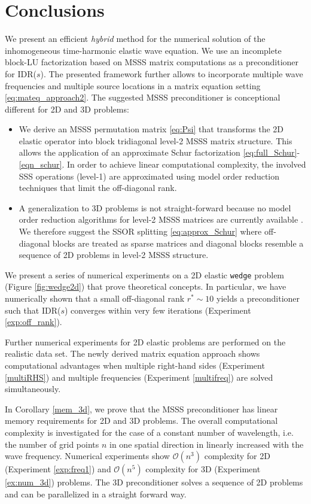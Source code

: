 \section{Conclusions}
We present an efficient \textit{hybrid} method for the numerical solution of the inhomogeneous time-harmonic elastic wave equation. We use an incomplete block-LU factorization based on MSSS matrix computations as a preconditioner for IDR($s$). The presented framework further allows to incorporate multiple wave frequencies and multiple source locations in a matrix equation setting \eqref{eq:mateq_approach2}. The suggested MSSS preconditioner is conceptional different for 2D and 3D problems:
\begin{itemize}
 \item We derive an MSSS permutation matrix \eqref{eq:Psi} that transforms the 2D elastic operator into block tridiagonal level-2 MSSS matrix structure. This allows the application of an approximate Schur factorization \eqref{eq:full_Schur}-\eqref{eqn_schur}. In order to a\-chieve linear computational complexity, the involved SSS operations (level-1) are approximated using model order reduction techniques that limit the off-diagonal rank.
 \item A generalization to 3D problems is not straight-forward because no model order reduction algorithms for level-2 MSSS matrices are currently available \cite{QG15}. We therefore suggest the SSOR splitting \eqref{eq:approx_Schur} where off-diagonal blocks are treated as sparse matrices and diagonal blocks resemble a sequence of 2D problems in level-2 MSSS structure.
\end{itemize}

We present a series of numerical experiments on a 2D elastic \texttt{wedge} problem (Figure \ref{fig:wedge2d}) that prove theoretical concepts. In particular, we have numerically shown that a small off-di\-ag\-o\-nal rank $r^\ast \sim 10$ yields a preconditioner such that IDR($s$) converges within very few iterations (Experiment \ref{exp:off_rank}).

Further numerical experiments for 2D elastic problems are performed on the realistic \marmousi data set. The newly derived matrix equation approach shows computational advantages when multiple right-hand sides (Experiment \ref{multiRHS}) and multiple frequencies (Experiment \ref{multifreq}) are solved simultaneously.

In Corollary \ref{mem_3d}, we prove that the MSSS preconditioner has linear memory requirements for 2D and 3D problems. The overall computational complexity is investigated for the case of a constant number of wavelength, i.e. the number of grid points $n$ in one spatial direction in linearly increased with the wave frequency. Numerical experiments show $\mathcal{O}(n^3)$ complexity for 2D (Experiment \ref{exp:freq1}) and $\mathcal{O}(n^5)$ complexity for 3D (Experiment \ref{ex:num_3d}) problems. The 3D preconditioner solves a sequence of 2D problems and can be parallelized in a straight forward way. 

